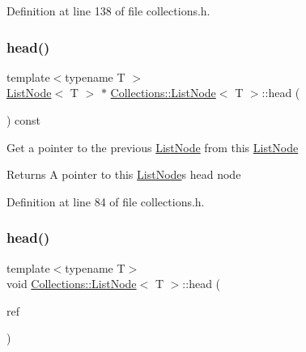 Definition at line 138 of file collections.\+h.

\hypertarget{class_collections_1_1_list_node_a914e3ed4b565faa4cef38e9f7b28bfee}{}\label{class_collections_1_1_list_node_a914e3ed4b565faa4cef38e9f7b28bfee} 
\subsubsection{\texorpdfstring{head()}{head()}\hspace{0.1cm}{\footnotesize\ttfamily [1/2]}}
{\footnotesize\ttfamily template$<$typename T $>$ \\
\hyperlink{class_collections_1_1_list_node}{List\+Node}$<$ T $>$ $\ast$ \hyperlink{class_collections_1_1_list_node}{Collections\+::\+List\+Node}$<$ T $>$\+::head (\begin{DoxyParamCaption}{ }\end{DoxyParamCaption}) const}

Get a pointer to the previous \hyperlink{class_collections_1_1_list_node}{List\+Node} from this \hyperlink{class_collections_1_1_list_node}{List\+Node} \begin{DoxyReturn}{Returns}
A pointer to this \hyperlink{class_collections_1_1_list_node}{List\+Node}\textquotesingle{}s head node 
\end{DoxyReturn}


Definition at line 84 of file collections.\+h.

\hypertarget{class_collections_1_1_list_node_af336d8b69f73ae5c40874572a688c48a}{}\label{class_collections_1_1_list_node_af336d8b69f73ae5c40874572a688c48a} 
\subsubsection{\texorpdfstring{head()}{head()}\hspace{0.1cm}{\footnotesize\ttfamily [2/2]}}
{\footnotesize\ttfamily template$<$typename T$>$ \\
void \hyperlink{class_collections_1_1_list_node}{Collections\+::\+List\+Node}$<$ T $>$\+::head (\begin{DoxyParamCaption}\item[{\hyperlink{class_collections_1_1_list_node}{List\+Node}$<$ T $>$ $\ast$}]{ref }\end{DoxyParamCaption})}

